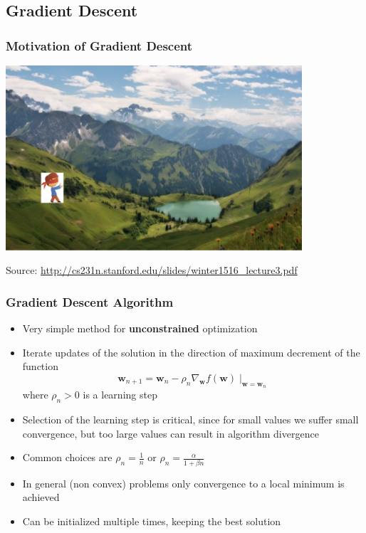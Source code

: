 \documentclass{beamer}
\newcommand{\w}{{\mathbf w}}
\begin{document}
\subsection{Gradient Descent}
\begin{frame}

	\frametitle{Motivation of Gradient Descent}

\centerline{\includegraphics[width=11cm]{./figs/grad_desc1.png}}

Source: \url{http://cs231n.stanford.edu/slides/winter1516_lecture3.pdf}

\end{frame}

\begin{frame}

	\frametitle{Gradient Descent Algorithm}

\begin{itemize}
\item Very simple method for {\bf unconstrained} optimization
\item Iterate updates of the solution in the direction of maximum decrement of the function
$$\w_{n+1} = \w_n - \rho_n \nabla_\w f(\w)\mid_{\w=\w_n} $$
where $\rho_n>0$ is a learning step
\item Selection of the learning step is critical, since for small values we suffer small convergence, but too large values can result in algorithm divergence
\item Common choices are $\rho_n = \frac{1}{n}$ or $\rho_n = \frac{\alpha}{1 + \beta n}$
\item In general (non convex) problems only convergence to a local minimum is achieved
\item Can be initialized multiple times, keeping the best solution
\end{itemize}

\end{frame}
\end{document}
